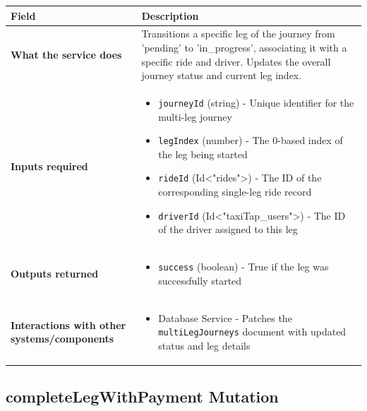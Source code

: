 \documentclass[11pt,a4paper]{article}
\begin{document}
\begin{longtable}{|p{4cm}|p{12cm}|}
\hline
\textbf{Field} & \textbf{Description} \\
\hline
\textbf{What the service does} & 
Transitions a specific leg of the journey from 'pending' to 'in\_progress', associating it with a specific ride and driver. Updates the overall journey status and current leg index. \\
\hline
\textbf{Inputs required} & 
\begin{itemize}[nosep]
\item \texttt{journeyId} (string) - Unique identifier for the multi-leg journey
\item \texttt{legIndex} (number) - The 0-based index of the leg being started
\item \texttt{rideId} (Id<"rides">) - The ID of the corresponding single-leg ride record
\item \texttt{driverId} (Id<"taxiTap\_users">) - The ID of the driver assigned to this leg
\end{itemize} \\
\hline
\textbf{Outputs returned} & 
\begin{itemize}[nosep]
\item \texttt{success} (boolean) - True if the leg was successfully started
\end{itemize} \\
\hline
\textbf{Interactions with other systems/components} & 
\begin{itemize}[nosep]
\item Database Service - Patches the \texttt{multiLegJourneys} document with updated status and leg details
\end{itemize} \\
\hline
\end{longtable}

\subsection{completeLegWithPayment Mutation}
\end{document}
